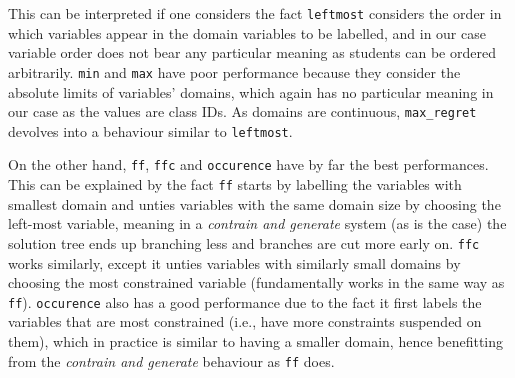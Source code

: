 \documentclass[runningheads]{llncs}
\begin{document}
This can be interpreted if one considers the fact \texttt{leftmost} considers the order in which variables appear in the domain variables to be labelled, and in our case variable order does not bear any particular meaning as students can be ordered arbitrarily. \texttt{min} and \texttt{max} have poor performance because they consider the absolute limits of variables' domains, which again has no particular meaning in our case as the values are class IDs. As domains are continuous, \texttt{max\_regret} devolves into a behaviour similar to \texttt{leftmost}.

On the other hand, \texttt{ff}, \texttt{ffc} and \texttt{occurence} have by far the best performances. This can be explained by the fact \texttt{ff} starts by labelling the variables with smallest domain and unties variables with the same domain size by choosing the left-most variable, meaning in a \textit{contrain and generate} system (as is the case) the solution tree ends up branching less and branches are cut more early on. \texttt{ffc} works similarly, except it unties variables with similarly small domains by choosing the most constrained variable (fundamentally works in the same way as \texttt{ff}). \texttt{occurence} also has a good performance due to the fact it first labels the variables that are most constrained (i.e., have more constraints suspended on them), which in practice is similar to having a smaller domain, hence benefitting from the \textit{contrain and generate} behaviour as \texttt{ff} does.
\end{document}
